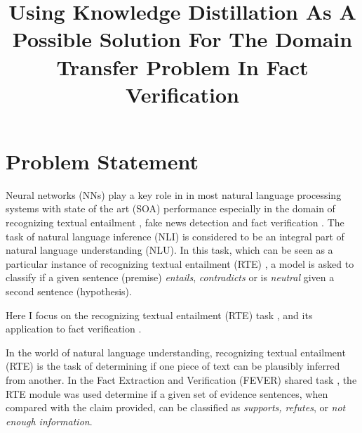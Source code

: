 \documentclass[compsoc,onecolumn]{IEEEtran}
\begin{document}
\title{Using Knowledge Distillation As A Possible Solution For The Domain Transfer Problem In Fact Verification }


\author{\IEEEauthorblockN{}
}



\maketitle



\section{Problem Statement}
Neural networks (NNs)  play a key role in in most natural language processing systems with state of the art (SOA) performance \citep*{devlin2018bert, sun2018improving,bohnet2018morphosyntactic} especially in the domain of recognizing textual entailment \citep*{kim2018semantic}, fake news detection \citep*{baird2017talos} and fact verification \citep*{nie2018combining}.
The task of natural language inference (NLI) is considered to be an integral part of natural language understanding (NLU). In this task, which can be seen as a particular instance of recognizing textual entailment (RTE) \citep*{fyodorov2000natural,condoravdi2003entailment,bos2005recognising,maccartney2009extended}, a model is asked to classify if a given sentence (premise) \textit{entails}, \textit{contradicts} or is \textit{neutral} given a second sentence (hypothesis).

Here I focus on the recognizing textual entailment (RTE) task \citep*{dagan2013recognizing}, and its application to fact verification \citep*{thorne2018fever}.

In the world of natural language understanding, recognizing textual entailment (RTE) is the task of determining if one piece of text can be plausibly inferred from another. In the Fact Extraction and Verification (FEVER) shared task \citep*{thorne2018fever}, the RTE module was used determine if a given set of evidence sentences, when compared with the claim provided, can be classified as \textit{supports, refutes}, or \textit{not enough information}.
\end{document}
